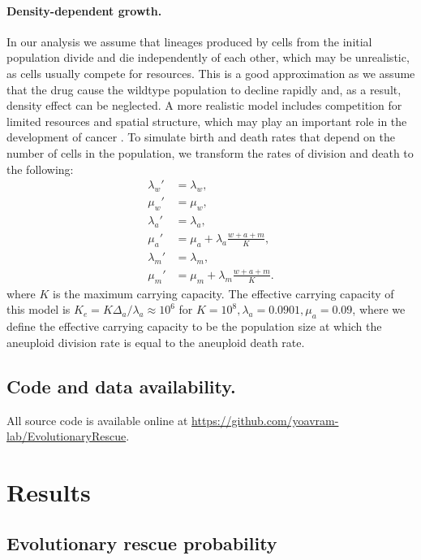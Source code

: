 \documentclass[12pt]{extarticle}
\begin{document}
\paragraph{Density-dependent growth.}

In our analysis we assume that lineages produced by cells from the initial population divide and die independently of each other, which may be unrealistic, as cells usually compete for resources. This is a good approximation as we assume that the drug cause the wildtype population to decline rapidly and, as a result, density effect can be neglected.
A more realistic model includes competition for limited resources and spatial structure, which may play an important role in the development of cancer \citep[e.g.,][]{martens2011spatial}.
To simulate birth and death rates that depend on the number of cells in the population, we transform the rates of division and death to the following:
\begin{align*}
\lambda_w' &= \lambda_w, \\
\mu_w' &= \mu_w,\\
\lambda_a' &= \lambda_a,\\ 
\mu_a' &= \mu_a + \lambda_a\frac{w+a+m}{K},\\
\lambda_m' &= \lambda_m,\\ 
\mu_m' &= \mu_m + \lambda_m\frac{w+a+m}{K}.
\end{align*}
where $K$ is the maximum carrying capacity. The effective carrying capacity of this model is $K_e=K\Delta_a/\lambda_a\approx10^6$ for $K=10^8, \lambda_a=0.0901,\mu_a=0.09$, where we define the effective carrying capacity to be the population size at which the aneuploid division rate is equal to the aneuploid death rate. 


\subsection*{Code and data availability.} All source code is available online at \url{https://github.com/yoavram-lab/EvolutionaryRescue}.


\section*{Results}


\subsection*{Evolutionary rescue probability}
\end{document}
